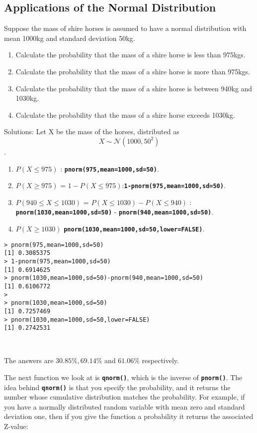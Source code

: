 \documentclass[a4paper,12pt]{article}
\begin{document}
\subsection{Applications of the Normal Distribution}
Suppose the mass of shire horses is assumed to have a normal distribution with mean 1000kg and standard deviation 50kg. 
\begin{enumerate}
\item Calculate the probability that the mass of a shire horse is less than 975kgs.
\item Calculate the probability that the mass of a shire horse is more than 975kgs.
\item Calculate the probability that the mass of a shire horse is between 940kg and 1030kg.         
\item Calculate the probability that the mass of a shire horse exceeds 1030kg.                
\end{enumerate}

Solutions: Let X be the mass of the horses, distributed as
\[ X \sim \mathcal{N}(1000,50^2)\].
\begin{enumerate}
\item $P(X \leq 975)$ : \texttt{\textbf{pnorm(975,mean=1000,sd=50)}}.
\item $P(X \geq 975)$ =  $ 1- P(X \leq 975)$:\texttt{\textbf{1-pnorm(975,mean=1000,sd=50)}}. 
\item $P(940 \leq X \leq 1030)$ = $P(X \leq 1030) -  P(X \leq 940)$  : \texttt{\textbf{pnorm(1030,mean=1000,sd=50)}} - \texttt{\textbf{pnorm(940,mean=1000,sd=50)}}.     
\item $P(X \geq 1030)$       \texttt{\textbf{pnorm(1030,mean=1000,sd=50,lower=FALSE)}}.
\end{enumerate}
\begin{verbatim}
> pnorm(975,mean=1000,sd=50)
[1] 0.3085375
> 1-pnorm(975,mean=1000,sd=50)
[1] 0.6914625
> pnorm(1030,mean=1000,sd=50)-pnorm(940,mean=1000,sd=50)
[1] 0.6106772
>
> pnorm(1030,mean=1000,sd=50)
[1] 0.7257469
> pnorm(1030,mean=1000,sd=50,lower=FALSE)
[1] 0.2742531



\end{verbatim}
The answers are $30.85\%,69.14\%$ and $61.06\%$ respectively.

The next function we look at is \texttt{\textbf{qnorm()}}, which is the inverse of \texttt{\textbf{pnorm()}}. The idea behind \texttt{\textbf{qnorm()}} is that you specify the probability, and it returns the number whose cumulative distribution matches the probability. 
For example, if you have a normally distributed random variable with mean zero and standard deviation one, then if you give the function a probability it returns the associated Z-value:
\end{document}

